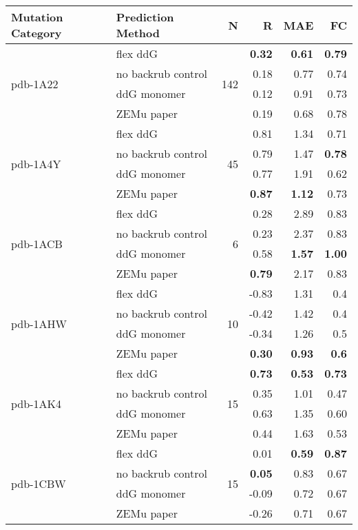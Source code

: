 {\small
\begin{longtable}{llrrrr}
\toprule
Mutation Category &   Prediction Method &   N &     R &  MAE &   FC \\
\midrule
 \multirow{ 4}{*}{pdb-1A22} & flex ddG & \multirow{ 4}{*}{142} & \textbf{0.32} & \textbf{0.61} & \textbf{0.79}  \\
 & no backrub control & & 0.18 & 0.77 & 0.74  \\
 & ddG monomer & & 0.12 & 0.91 & 0.73  \\
 & ZEMu paper & & 0.19 & 0.68 & 0.78  \\
\hline
 \multirow{ 4}{*}{pdb-1A4Y} & flex ddG & \multirow{ 4}{*}{45} & 0.81 & 1.34 & 0.71  \\
 & no backrub control & & 0.79 & 1.47 & \textbf{0.78}  \\
 & ddG monomer & & 0.77 & 1.91 & 0.62  \\
 & ZEMu paper & & \textbf{0.87} & \textbf{1.12} & 0.73  \\
\hline
 \multirow{ 4}{*}{pdb-1ACB} & flex ddG & \multirow{ 4}{*}{6} & 0.28 & 2.89 & 0.83  \\
 & no backrub control & & 0.23 & 2.37 & 0.83  \\
 & ddG monomer & & 0.58 & \textbf{1.57} & \textbf{1.00}  \\
 & ZEMu paper & & \textbf{0.79} & 2.17 & 0.83  \\
\hline
 \multirow{ 4}{*}{pdb-1AHW} & flex ddG & \multirow{ 4}{*}{10} & -0.83 & 1.31 & 0.4  \\
 & no backrub control & & -0.42 & 1.42 & 0.4  \\
 & ddG monomer & & -0.34 & 1.26 & 0.5  \\
 & ZEMu paper & & \textbf{0.30} & \textbf{0.93} & \textbf{0.6}  \\
\hline
 \multirow{ 4}{*}{pdb-1AK4} & flex ddG & \multirow{ 4}{*}{15} & \textbf{0.73} & \textbf{0.53} & \textbf{0.73}  \\
 & no backrub control & & 0.35 & 1.01 & 0.47  \\
 & ddG monomer & & 0.63 & 1.35 & 0.60  \\
 & ZEMu paper & & 0.44 & 1.63 & 0.53  \\
\hline
 \multirow{ 4}{*}{pdb-1CBW} & flex ddG & \multirow{ 4}{*}{15} & 0.01 & \textbf{0.59} & \textbf{0.87}  \\
 & no backrub control & & \textbf{0.05} & 0.83 & 0.67  \\
 & ddG monomer & & -0.09 & 0.72 & 0.67  \\
 & ZEMu paper & & -0.26 & 0.71 & 0.67  \\

\end{longtable}}
